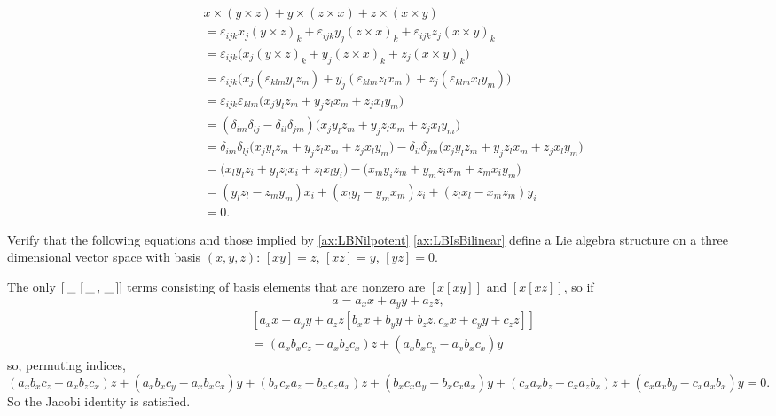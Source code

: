\documentclass{article}
\newcommand*\wc{{\mkern 3mu\_\mkern 3mu}}
\newcommand{\lb}[1]{\ensuremath{\left[{#1}\right]}}
\begin{document}
\begin{align*}
    &x \times (y \times z)
    +
    y \times (z \times x)
    +
    z \times (x \times y)
    \\
    &=
    \varepsilon_{ijk}x_j(y \times z)_k
    +
    \varepsilon_{ijk}y_j(z \times x)_k
    +
    \varepsilon_{ijk}z_j(x \times y)_k
    \\
    &=
    \varepsilon_{ijk}
    \Big(
        x_j(y \times z)_k
        + y_j(z \times x)_k
        + z_j(x \times y)_k
    \Big)
    \\
    &=
    \varepsilon_{ijk}
    \Big(
        x_j(\varepsilon_{klm}y_lz_m)
        + y_j(\varepsilon_{klm}z_lx_m)
        + z_j(\varepsilon_{klm}x_ly_m)
    \Big)
    \\
    &=
    \varepsilon_{ijk}
    \varepsilon_{klm}
    \Big(x_jy_lz_m + y_jz_lx_m + z_jx_ly_m\Big)
    \\
    &=
    (\delta_{im}\delta_{lj} - \delta_{il}\delta_{jm})
    \Big(x_jy_lz_m + y_jz_lx_m + z_jx_ly_m\Big)
    \\
    &=
    \delta_{im}\delta_{lj}
    \Big(x_jy_lz_m + y_jz_lx_m + z_jx_ly_m\Big)
    -
    \delta_{il}\delta_{jm}
    \Big(x_jy_lz_m + y_jz_lx_m + z_jx_ly_m\Big)
    \\
    &=
    \Big(x_ly_lz_i + y_lz_lx_i + z_lx_ly_i\Big)
    -
    \Big(x_my_iz_m + y_mz_ix_m + z_mx_iy_m\Big)
    \\
    &=
    (y_lz_l - z_my_m)x_i
    + (x_ly_l - y_mx_m)z_i
    + (z_lx_l - x_mz_m)y_i
    \\
    &=
    0.
\end{align*}

\begin{exercise}[Humphreys 1.2]
    Verify that the following equations and those implied by \ref{ax:LBNilpotent} \ref{ax:LBIsBilinear} define a Lie algebra structure on a three dimensional vector space with basis $(x, y, z)$: $\lb{xy} = z$, $\lb{xz} = y$, $\lb{yz} = 0$.
\end{exercise}

The only $\lb{\wc\lb{\wc,\wc}}$ terms consisting of basis elements that are nonzero are $\lb{x\lb{xy}}$ and $\lb{x\lb{xz}}$, so if
\[
    a
    =
    a_xx + a_yy + a_zz,
\]
\begin{align*}
    &\lb{
        a_x x + a_y y + a_z z
        \lb{
            b_x x + b_y y + b_z z,
            c_x x + c_y y + c_z z
        }
    }
    \\
    &=
    (a_xb_xc_z - a_xb_zc_x)z
    + (a_xb_xc_y - a_xb_xc_x)y
\end{align*}
so, permuting indices, 
\[
    (a_xb_xc_z - a_xb_zc_x)z
    + (a_xb_xc_y - a_xb_xc_x)y
    + (b_xc_xa_z - b_xc_za_x)z
    + (b_xc_xa_y - b_xc_xa_x)y
    + (c_xa_xb_z - c_xa_zb_x)z
    + (c_xa_xb_y - c_xa_xb_x)y
    =
    0.
\]
So the Jacobi identity is satisfied.
\end{document}

